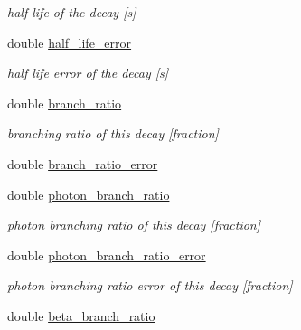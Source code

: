 \begin{DoxyCompactItemize}
\begin{DoxyCompactList}\small\item\em half life of the decay \mbox{[}s\mbox{]} \end{DoxyCompactList}\item 
double \hyperlink{structpyne_1_1decay_a86b701ada7ee8d4a8fec95aedd711a87}{half\+\_\+life\+\_\+error}\hypertarget{structpyne_1_1decay_a86b701ada7ee8d4a8fec95aedd711a87}{}\label{structpyne_1_1decay_a86b701ada7ee8d4a8fec95aedd711a87}

\begin{DoxyCompactList}\small\item\em half life error of the decay \mbox{[}s\mbox{]} \end{DoxyCompactList}\item 
double \hyperlink{structpyne_1_1decay_a21a58630e6aac8aa5517fb9d1bafe5d6}{branch\+\_\+ratio}\hypertarget{structpyne_1_1decay_a21a58630e6aac8aa5517fb9d1bafe5d6}{}\label{structpyne_1_1decay_a21a58630e6aac8aa5517fb9d1bafe5d6}

\begin{DoxyCompactList}\small\item\em branching ratio of this decay \mbox{[}fraction\mbox{]} \end{DoxyCompactList}\item 
double \hyperlink{structpyne_1_1decay_a6df2be5724d68bfe566b53fa71320812}{branch\+\_\+ratio\+\_\+error}
\item 
double \hyperlink{structpyne_1_1decay_a7edc52996ae0705ac8c35fb6c437c3a8}{photon\+\_\+branch\+\_\+ratio}\hypertarget{structpyne_1_1decay_a7edc52996ae0705ac8c35fb6c437c3a8}{}\label{structpyne_1_1decay_a7edc52996ae0705ac8c35fb6c437c3a8}

\begin{DoxyCompactList}\small\item\em photon branching ratio of this decay \mbox{[}fraction\mbox{]} \end{DoxyCompactList}\item 
double \hyperlink{structpyne_1_1decay_a5492d786323042f5348897584065ec02}{photon\+\_\+branch\+\_\+ratio\+\_\+error}\hypertarget{structpyne_1_1decay_a5492d786323042f5348897584065ec02}{}\label{structpyne_1_1decay_a5492d786323042f5348897584065ec02}

\begin{DoxyCompactList}\small\item\em photon branching ratio error of this decay \mbox{[}fraction\mbox{]} \end{DoxyCompactList}\item 
double \hyperlink{structpyne_1_1decay_a566b715c5e41239f2c178880ae3dc3c5}{beta\+\_\+branch\+\_\+ratio}\hypertarget{structpyne_1_1decay_a566b715c5e41239f2c178880ae3dc3c5}{}\label{structpyne_1_1decay_a566b715c5e41239f2c178880ae3dc3c5}


\end{DoxyCompactItemize}
